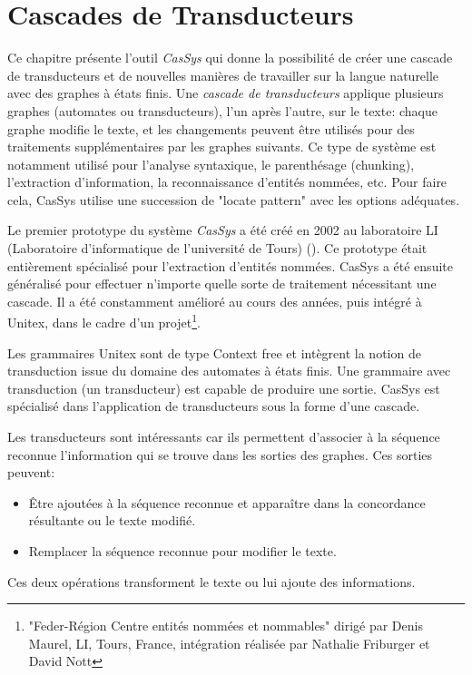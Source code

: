 \chapter{Cascades de Transducteurs}
\label{chap-cassys}

Ce chapitre présente l'outil \textit{CasSys} qui donne la possibilité de créer une cascade
de  transducteurs et de nouvelles manières de travailler sur la langue naturelle avec des 
graphes à états finis. Une \textit{cascade de transducteurs} 
applique plusieurs graphes (automates ou transducteurs), l'un après l'autre, sur le texte: chaque
graphe modifie le texte, et les changements peuvent être utilisés pour des traitements supplémentaires
par les graphes suivants. Ce type de  système est notamment utilisé pour l'analyse syntaxique, le parenthésage (chunking),
l'extraction d'information, la reconnaissance d'entités nommées, etc. Pour faire cela, CasSys utilise
une succession de "locate pattern" avec les options adéquates.

\bigskip
\noindent Le premier prototype du système \textit{CasSys}   a été créé en 2002 au 
laboratoire LI (Laboratoire d'informatique de l'université de Tours) (\cite{these-nathalie}). 
Ce prototype était entièrement spécialisé pour l'extraction d'entités nommées. CasSys a été  
ensuite généralisé pour effectuer n'importe quelle sorte de traitement nécessitant une cascade. 
Il a été constamment amélioré au cours des années, puis intégré à Unitex, dans le cadre d'un projet\footnote{"Feder-Région Centre entités nommées et nommables" 
dirigé par Denis Maurel, LI, Tours, France, intégration réalisée par Nathalie Friburger et
David Nott}.

\bigskip
\noindent Les grammaires Unitex sont de type Context free et intègrent la notion de transduction issue
du domaine des automates à états finis. Une grammaire avec transduction (un  transducteur) est
capable de produire une sortie. CasSys est spécialisé dans l'application de transducteurs sous
la forme d'une cascade.

\bigskip
\noindent
Les transducteurs sont intéressants car ils permettent d'associer à la séquence
reconnue l'information qui se trouve dans les sorties des graphes.
Ces  sorties peuvent:
\begin{itemize}
\item Être ajoutées à la séquence reconnue et apparaître dans la concordance résultante ou le texte modifié.
\item Remplacer la séquence reconnue pour modifier le texte.
\end{itemize}
\noindent Ces deux  opérations transforment le texte ou lui ajoute des informations.

